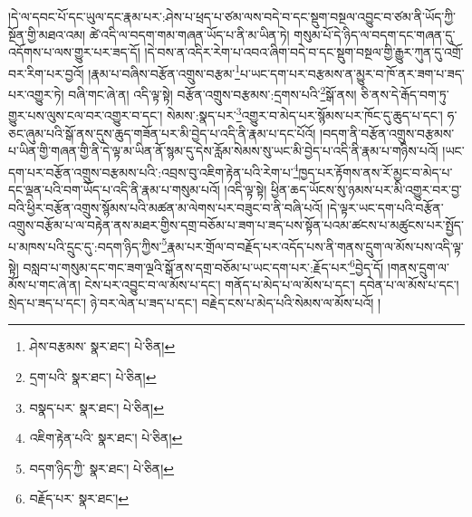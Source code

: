 །དེ་ལ་དབང་པོ་དང་ཡུལ་དང་རྣམ་པར་:ཤེས་པ་ཕྲད་པ་ཙམ་ལས་བདེ་བ་དང་སྡུག་བསྔལ་འབྱུང་བ་ཙམ་ནི་ཡོད་ཀྱི་སྔོན་གྱི་མཐའ་འམ། ཚེ་འདི་ལ་བདག་གམ་གཞན་ཡོད་པ་ནི་མ་ཡིན་ཏེ། གསུམ་པོ་དེ་ཉིད་ལ་བདག་དང་གཞན་དུ་འདོགས་པ་ལས་གྱུར་པར་ཟད་དོ། །དེ་བས་ན་འདིར་རེག་པ་འབའ་ཞིག་བདེ་བ་དང་སྡུག་བསྔལ་གྱི་རྒྱུར་ཀུན་དུ་འགྲོ་བར་རིག་པར་བྱའོ། །རྣམ་པ་བཞིས་བརྩོན་འགྲུས་བརྩམ་\footnote{ཤེས་བརྩམས་  སྣར་ཐང་།  པེ་ཅིན། }པ་ཡང་དག་པར་བརྩམས་ན་མྱུར་བ་ཁོ་ནར་ཟག་པ་ཟད་པར་འགྱུར་ཏེ། བཞི་གང་ཞེ་ན། འདི་ལྟ་སྟེ། བརྩོན་འགྲུས་བརྩམས་:དྲགས་པའི་\footnote{དྲག་པའི་  སྣར་ཐང་།  པེ་ཅིན། }སྒོ་ནས། ཅི་ནས་དེ་རྒོད་བག་ཏུ་གྱུར་པས་ལུས་ངལ་བར་འགྱུར་བ་དང་། སེམས་:སྣད་པར་\footnote{བསྣད་པར་  སྣར་ཐང་།  པེ་ཅིན། }འགྱུར་བ་མེད་པར་སྙོམས་པར་ཁོང་དུ་ཆུད་པ་དང་། ཧ་ཅང་ཞུམ་པའི་སྒོ་ནས་དུས་ཆུད་གཟོན་པར་མི་བྱེད་པ་འདི་ནི་རྣམ་པ་དང་པོའོ། །བདག་ནི་བརྩོན་འགྲུས་བརྩམས་པ་ཡིན་གྱི་གཞན་གྱི་ནི་དེ་ལྟ་མ་ཡིན་ནོ་སྙམ་དུ་དེས་རློམ་སེམས་སུ་ཡང་མི་བྱེད་པ་འདི་ནི་རྣམ་པ་གཉིས་པའོ། །ཡང་དག་པར་བརྩོན་འགྲུས་བརྩམས་པའི་:འབྲས་བུ་འཇིག་རྟེན་པའི་རེག་པ་\footnote{འཇིག་རྟེན་པའི་  སྣར་ཐང་།  པེ་ཅིན། }ཁྱད་པར་རྟོགས་ནས་རོ་མྱང་བ་མེད་པ་དང་ལྡན་པའི་བག་ཡོད་པ་འདི་ནི་རྣམ་པ་གསུམ་པའོ། །འདི་ལྟ་སྟེ། ཕྱིན་ཆད་ཡོངས་སུ་ཉམས་པར་མི་འགྱུར་བར་བྱ་བའི་ཕྱིར་བརྩོན་འགྲུས་སྙོམས་པའི་མཚན་མ་ལེགས་པར་བཟུང་བ་ནི་བཞི་པའོ། །དེ་ལྟར་ཡང་དག་པའི་བརྩོན་འགྲུས་བརྩོམ་པ་ལ་བརྟེན་ནས་མཐར་གྱིས་དགྲ་བཅོམ་པ་ཟག་པ་ཟད་པས་སྟོན་པའམ་ཚངས་པ་མཚུངས་པར་སྤྱོད་པ་མཁས་པའི་དྲུང་དུ་:བདག་ཉིད་ཀྱིས་\footnote{བདག་ཉིད་ཀྱི་  སྣར་ཐང་།  པེ་ཅིན། }རྣམ་པར་གྲོལ་བ་བརྗོད་པར་འདོད་པས་ནི་གནས་དྲུག་ལ་མོས་པས་འདི་ལྟ་སྟེ། བསླབ་པ་གསུམ་དང་གང་ཟག་ལྔའི་སྒོ་ནས་དགྲ་བཅོམ་པ་ཡང་དག་པར་:རྗོད་པར་\footnote{བརྗོད་པར་  སྣར་ཐང་། }བྱེད་དོ། །གནས་དྲུག་ལ་མོས་པ་གང་ཞེ་ན། ངེས་པར་འབྱུང་བ་ལ་མོས་པ་དང་། གནོད་པ་མེད་པ་ལ་མོས་པ་དང་། དབེན་པ་ལ་མོས་པ་དང་། སྲེད་པ་ཟད་པ་དང་། ཉེ་བར་ལེན་པ་ཟད་པ་དང་། བརྗེད་ངས་པ་མེད་པའི་སེམས་ལ་མོས་པའོ། །
